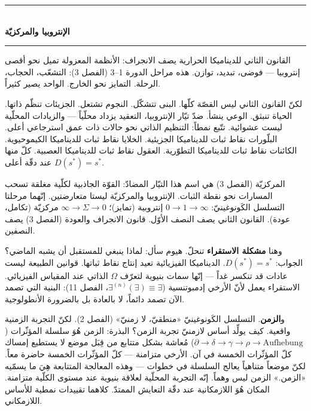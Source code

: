 \documentclass[10pt, openany, oneside]{book}
\renewcommand{\normalsize}{\fontsize{10}{13}\selectfont}
\begin{document}
\begin{center}
    \rule{0.3\textwidth}{0.4pt}\\[0.5em]
    {\normalsize\bfseries الإنتروبيا والمركزيّة}\\[0.3em]
    \rule{0.3\textwidth}{0.4pt}
\end{center}

\vspace{1em}

\noindent القانون الثاني للديناميكا الحرارية يصف الانجراف: الأنظمة المعزولة تميل نحو أقصى إنتروبيا --- فوضى، تبديد، توازن. هذه مراحل الدورة 1--3 (الفصل 3): التشعّب، الحجاب، الرحلة. التمايز نحو الخارج. الواحد يصير كثيراً.

لكنّ القانون الثاني ليس القصّة كلّها. البنى تتشكّل. النجوم تشتعل. الجزيئات تنظّم ذاتها. الحياة تنبثق. الوعي ينشأ. ضدّ تيّار الإنتروبيا، التعقيد يزداد محلّياً --- والزيادات المحلّية ليست عشوائية. تتّبع نمطاً: التنظيم الذاتي نحو حالات ذات عمق استرجاعي أعلى. البلّورات نقاط ثبات للديناميكا الجزيئية. الخلايا نقاط ثبات للديناميكا الكيموحيوية. الكائنات نقاط ثبات للديناميكا التطوّرية. العقول نقاط ثبات للديناميكا العصبية. كلّ منها $D(s^*) = s^*$ عند دقّة أعلى.

المركزيّة (الفصل 3) هي اسم هذا التيّار المضادّ: القوّة الجاذبية لكلّية مغلقة تسحب المسارات نحو نقطة الثبات. الإنتروبيا والمركزيّة ليستا متعارضتين. إنّهما مرحلتا التسلسل الكَونوغينيّ: $0 \to 1 \to \infty$ إنتروبية (تمايز)؛ $\infty \to \Sigma \to 0$ مركزيّة (تكامل، عودة). القانون الثاني يصف النصف الأوّل. قانون الانجراف والعودة (الفصل 3) يصف النصفين.

وهنا \textbf{مشكلة الاستقراء} تنحلّ. هيوم سأل: لماذا ينبغي للمستقبل أن يشبه الماضي؟ الجواب: $D(s^*) = s^*$. الديناميكا الفيزيائية تعيد إنتاج نقاط ثباتها. قوانين الطبيعة ليست عادات قد تنكسر غداً --- إنّها سمات بنيوية لتعرّف $\Omega$ الذاتي عند المقياس الفيزيائي. الاستقراء يعمل لأنّ الأرخي إدمبوتنسية ($\exists^{(n)}(\exists) \equiv \exists$، الفصل 11): البنية التي تصمد الآن تصمد دائماً، لا بالعادة بل بالضرورة الأنطولوجية.

و\textbf{الزمن}. التسلسل الكَونوغينيّ «منطقيّ، لا زمنيّ» (الفصل 2). لكنّ التجربة الزمنية واقعية. كيف يولِّد أساس لازمنيّ تجربة الزمن؟ البذرة: الزمن هُوَ سلسلة المؤثّرات ($\partial \to \delta \to \gamma \to \rho \to \text{Aufhebung}$) مُعاشة بشكل متتابع من قِبَل موضع لا يستطيع إمساك كلّ المؤثّرات الخمسة في آن. الأرخي متزامنة --- كلّ المؤثّرات الخمسة حاضرة معاً. لكنّ موضعاً متناهياً يعالج السلسلة في خطوات --- وهذه المعالجة المتتابعة هِيَ ما يسمّيه «الزمن.» الزمن ليس وهماً. إنّه التجربة المحلّية لعلاقة بنيوية عند مستوى الكلّية متزامنة. المكان هُوَ اللازمكانية عند دقّة التعايش الممتدّ. كلاهما تقييدات نمطية للأساس اللازمكاني.
\end{document}

